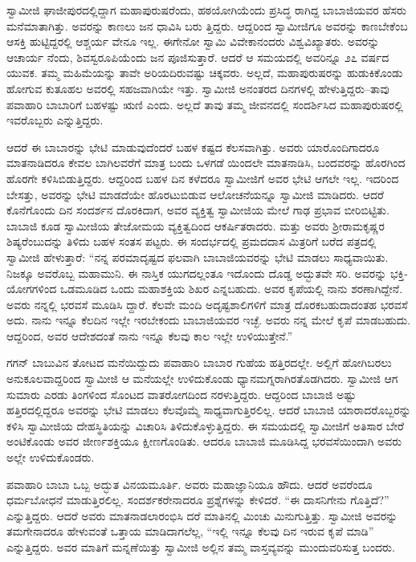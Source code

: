 ಸ್ವಾಮೀಜಿ ಘಾಜೀಪುರದಲ್ಲಿದ್ದಾಗ ಮಹಾಪುರುಷರೆಂದು, ಹಠಯೋಗಿಯೆಂದು ಪ್ರಸಿದ್ಧ ರಾಗಿದ್ದ ಬಾಬಾಜಿಯವರ ಹೆಸರು ಮನೆಮಾತಾಗಿತ್ತು. ಅವರನ್ನು ಕಾಣಲು ಜನ ಧಾವಿಸಿ ಬರು ತ್ತಿದ್ದರು. ಆದ್ದರಿಂದ ಸ್ವಾಮೀಜಿಗೂ ಅವರನ್ನು ಕಾಣಬೇಕೆಂಬ ಆಸಕ್ತಿ ಹುಟ್ಟಿದ್ದರಲ್ಲಿ ಆಶ್ಚರ್ಯ ವೇನೂ ಇಲ್ಲ. ಈಗೇನೋ ಸ್ವಾಮಿ ವಿವೇಕಾನಂದರು ವಿಶ್ವವಿಖ್ಯಾತರು. ಅವರನ್ನು ಆಚಾರ್ಯ ನೆಂದು, ಶಿವಸ್ವರೂಪಿಯೆಂದು ಜನ ಪೂಜಿಸುತ್ತಾರೆ. ಆದರೆ ಆ ಸಮಯದಲ್ಲಿ ಅವರಿನ್ನೂ ೨೭ ವರ್ಷದ ಯುವಕ. ತಮ್ಮ ಮಹಿಮೆಯನ್ನು ತಾವೇ ಅರಿಯದಿರುವಷ್ಟು ಚಿಕ್ಕವರು. ಅಲ್ಲದೆ, ಮಹಾಪುರುಷರನ್ನು ಹುಡುಕಿಕೊಂಡು ಹೋಗುವ ಕುತೂಹಲ ಅವರಲ್ಲಿ ಸಹಜವಾಗಿಯೇ ಇತ್ತು. ಸ್ವಾಮೀಜಿ ಅನಂತರದ ದಿನಗಳಲ್ಲಿ ಹೇಳುತ್ತಿದ್ದರು–ತಾವು ಪವಾಹಾರಿ ಬಾಬಾರಿಗೆ ಬಹಳಷ್ಟು ಋಣಿ ಎಂದು. ಅಲ್ಲದೆ ತಾವು ತಮ್ಮ ಜೀವನದಲ್ಲಿ ಸಂದರ್ಶಿಸಿದ ಮಹಾಪುರುಷರಲ್ಲಿ ಇವರೊಬ್ಬರು ಎನ್ನುತ್ತಿದ್ದರು.

ಆದರೆ ಈ ಬಾಬಾರನ್ನು ಭೇಟಿ ಮಾಡುವುದೆಂದರೆ ಬಹಳ ಕಷ್ಟದ ಕೆಲಸವಾಗಿತ್ತು. ಅವರು ಯಾರೊಂದಿಗಾದರೂ ಮಾತನಾಡಿದರೂ ಕೇವಲ ಬಾಗಿಲವರೆಗೆ ಮಾತ್ರ ಬಂದು ಒಳಗಡೆ ಯಿಂದಲೇ ಮಾತನಾಡಿಸಿ, ಬಂದವರನ್ನು ಹೊರಗಿಂದ ಹೊರಗೇ ಕಳಿಸಿಬಿಡುತ್ತಿದ್ದರು. ಆದ್ದರಿಂದ ಬಹಳ ದಿನ ಕಳೆದರೂ ಸ್ವಾಮೀಜಿಗೆ ಅವರ ಭೇಟಿ ಆಗಲೇ ಇಲ್ಲ. ಇದರಿಂದ ಬೇಸತ್ತು, ಅವರನ್ನು ಭೇಟಿ ಮಾಡದೆಯೇ ಹೊರಟುಬಿಡುವ ಆಲೋಚನೆಯನ್ನೂ ಸ್ವಾಮೀಜಿ ಮಾಡಿದರು. ಆದರೆ ಕೊನೆಗೊಂದು ದಿನ ಸಂದರ್ಶನ ದೊರಕಿದಾಗ, ಅವರ ವ್ಯಕ್ತಿತ್ವ ಸ್ವಾಮೀಜಿಯ ಮೇಲೆ ಗಾಢ ಪ್ರಭಾವ ಬೀರಿಬಿಟ್ಟಿತು. ಬಾಬಾಜಿ ಕೂಡ ಸ್ವಾಮೀಜಿಯ ತೇಜೋಮಯ ವ್ಯಕ್ತಿತ್ವದಿಂದ ಆಕರ್ಷಿತರಾದರು. ಮತ್ತು ಅವರು ಶ್ರೀರಾಮಕೃಷ್ಣರ ಶಿಷ್ಯರೆಂಬುದನ್ನು ತಿಳಿದು ಬಹಳ ಸಂತಸ ಪಟ್ಟರು. ಈ ಸಂದರ್ಭದಲ್ಲಿ ಪ್ರಮದದಾಸ ಮಿತ್ರರಿಗೆ ಬರೆದ ಪತ್ರದಲ್ಲಿ ಸ್ವಾಮೀಜಿ ಹೇಳುತ್ತಾರೆ: “ನನ್ನ ಪರಮಾದೃಷ್ಟದ ಫಲವಾಗಿ ಬಾಬಾಜಿಯವರನ್ನು ಭೇಟಿ ಮಾಡಲು ಸಾಧ್ಯವಾಯಿತು. ನಿಜಕ್ಕೂ ಅವರೊಬ್ಬ ಮಹಾಮುನಿ. ಈ ನಾಸ್ತಿಕ ಯುಗದಲ್ಲಂತೂ ಇದೊಂದು ದೊಡ್ಡ ಅದ್ಭುತವೇ ಸರಿ. ಅವರನ್ನು ಭಕ್ತಿ-ಯೋಗಗಳಿಂದ ಒಡಮೂಡಿದ ಒಂದು ಮಹಾಶಕ್ತಿಯ ಶಿಖರ ಎನ್ನಬಹುದು. ಅವರ ಕೃಪೆಯಲ್ಲಿ ನಾನು ಶರಣಾಗಿದ್ದೇನೆ. ಅವರು ನನ್ನಲ್ಲಿ ಭರವಸೆ ಮೂಡಿಸಿ ದ್ದಾರೆ. ಕೆಲವೇ ಮಂದಿ ಅದೃಷ್ಟಶಾಲಿಗಳಿಗೆ ಮಾತ್ರ ದೊರಕಬಹುದಾದಂತಹ ಭರವಸೆ ಅದು. ನಾನು ಇನ್ನೂ ಕೆಲದಿನ ಇಲ್ಲೇ ಇರಬೇಕಂದು ಬಾಬಾಜಿಯವರ ಇಚ್ಛೆ. ಅವರು ನನ್ನ ಮೇಲೆ ಕೃಪೆ ಮಾಡಬಹುದು. ಆದ್ದರಿಂದ, ಅವರ ಆದೇಶದಂತೆ ನಾನು ಇನ್ನೂ ಕೆಲವು ಕಾಲ ಇಲ್ಲೇ ಉಳಿಯುತ್ತೇನೆ.”

ಗಗನ್ ಬಾಬುವಿನ ತೋಟದ ಮನೆಯಿದ್ದುದು ಪವಾಹಾರಿ ಬಾಬಾರ ಗುಹೆಯ ಹತ್ತಿರದಲ್ಲೇ. ಅಲ್ಲಿಗೆ ಹೋಗಿಬರಲು ಅನುಕೂಲವಾದ್ದರಿಂದ ಸ್ವಾಮೀಜಿ ಆ ಮನೆಯಲ್ಲೇ ಉಳಿದುಕೊಂಡು ಧ್ಯಾನಮಗ್ನರಾಗಿರತೊಡಗಿದರು. ಸ್ವಾಮೀಜಿ ಆಗ ಸುಮಾರು ಎರಡು ತಿಂಗಳಿಂದ ಸೊಂಟದ ವಾತರೋಗದಿಂದ ನರಳುತ್ತಿದ್ದರು. ಆದ್ದರಿಂದ ಬಾಬಾಜಿ ಅಷ್ಟು ಹತ್ತಿರದಲ್ಲಿದ್ದರೂ ಅವರನ್ನು ಭೇಟಿ ಮಾಡಲು ಕೆಲವೊಮ್ಮೆ ಸಾಧ್ಯವಾಗುತ್ತಿರಲಿಲ್ಲ. ಆದರೆ ಬಾಬಾಜಿ ಯಾರಾದರೊಬ್ಬರನ್ನು ಕಳಿಸಿ ಸ್ವಾಮೀಜಿಯ ದೇಹಸ್ಥಿತಿಯನ್ನು ವಿಚಾರಿಸಿ ತಿಳಿದುಕೊಳ್ಳುತ್ತಿದ್ದರು. ಈ ಸಮಯದಲ್ಲಿ ಸ್ವಾಮೀಜಿಗೆ ಅತಿಸಾರ ಬೇರೆ ಅಂಟಿಕೊಂಡು ಅವರ ಜೀರ್ಣಶಕ್ತಿಯೂ ಕ್ಷೀಣಗೊಂಡಿತು. ಆದರೂ ಬಾಬಾಜಿ ಮೂಡಿಸಿದ್ದ ಭರವಸೆಯಿಂದಾಗಿ ಅವರು ಅಲ್ಲೇ ಉಳಿದುಕೊಂಡರು.

ಪವಾಹಾರಿ ಬಾಬಾ ಒಬ್ಬ ಅದ್ಭುತ ವಿನಯಮೂರ್ತಿ. ಅವರು ಮಹಾಜ್ಞಾನಿಯೂ ಹೌದು. ಆದರೆ ಅವರೆಂದೂ ಧರ್ಮಬೋಧನೆ ಮಾಡುತ್ತಿರಲಿಲ್ಲ. ಸಂದರ್ಶಕರೇನಾದರೂ ಪ್ರಶ್ನೆಗಳನ್ನು ಕೇಳಿದರೆ. “ಈ ದಾಸನಿಗೇನು ಗೊತ್ತಿದೆ?” ಎನ್ನುತ್ತಿದ್ದರು. ಆದರೆ ಅವರು ಮಾತನಾಡಲಾರಂಭಿಸಿ ದರೆ ಮಾತಿನಲ್ಲಿ ಮಿಂಚು ಮಿನುಗುತ್ತಿತ್ತು. ಸ್ವಾಮೀಜಿ ಅವರನ್ನು ತಮಗೇನಾದರೂ ಹೇಳುವಂತೆ ಒತ್ತಾಯ ಮಾಡಿದಾಗಲೆಲ್ಲ, “ಇಲ್ಲಿ ಇನ್ನೂ ಕೆಲವು ದಿನ ಇರುವ ಕೃಪೆ ಮಾಡಿ” ಎನ್ನುತ್ತಿದ್ದರು. ಅವರ ಮಾತಿಗೆ ಮನ್ನಣೆಯಿತ್ತು ಸ್ವಾಮೀಜಿ ಅಲ್ಲಿನ ತಮ್ಮ ವಾಸ್ತವ್ಯವನ್ನು ಮುಂದುವರಿಸುತ್ತ ಬಂದರು.

